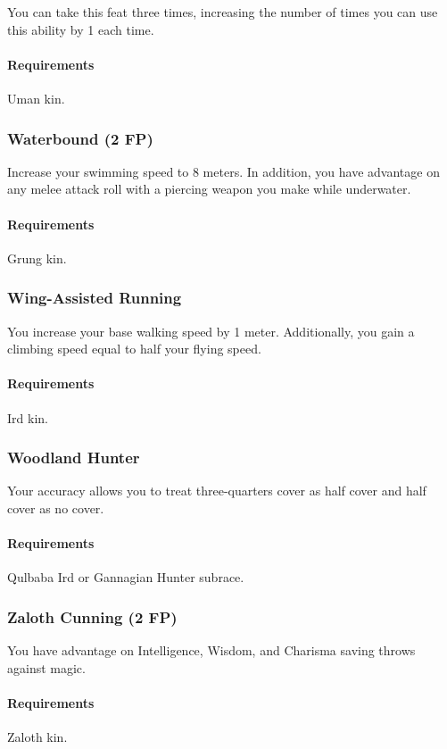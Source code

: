     You can take this feat three times, increasing the number of times you can use this ability by 1 each time.
    \paragraph{Requirements} Uman kin.
\subsubsection{Waterbound (2 FP)} \label{feat::waterbound}
    Increase your swimming speed to 8 meters.
    In addition, you have advantage on any melee attack roll with a piercing weapon you make while underwater.
    \paragraph{Requirements} Grung kin.
\subsubsection{Wing-Assisted Running} \label{feat::wingassistedrunning}
    You increase your base walking speed by 1 meter.
    Additionally, you gain a climbing speed equal to half your flying speed.
    \paragraph{Requirements} Ird kin.
\subsubsection{Woodland Hunter} \label{feat::woodlandhunter}
    Your accuracy allows you to treat three-quarters cover as half cover and half cover as no cover.
    \paragraph{Requirements} Qulbaba Ird or Gannagian Hunter subrace.
\subsubsection{Zaloth Cunning (2 FP)} \label{feat::zalothcunning}
    You have advantage on Intelligence, Wisdom, and Charisma saving throws against magic.
    \paragraph{Requirements} Zaloth kin.

\newpage~
\newpage
